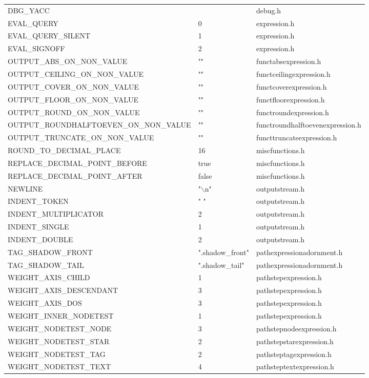 \begin{tiny}
\begin{longtable}[ht]{|p{0.45\tablwidth}|p{0.15\tablwidth}|p{0.3\tablwidth}|}
  \mythickhline DBG\_YACC & & debug.h \\
  \mythickhline EVAL\_QUERY & 0 & expression.h \\
  \hline EVAL\_QUERY\_SILENT & 1 & expression.h \\
  \hline EVAL\_SIGNOFF & 2 & expression.h \\
  \mythickhline OUTPUT\_ABS\_ON\_NON\_VALUE & "" & functabsexpression.h \\
  \hline OUTPUT\_CEILING\_ON\_NON\_VALUE & "" & functceilingexpression.h \\
  \hline OUTPUT\_COVER\_ON\_NON\_VALUE & "" & functcoverexpression.h \\
  \hline OUTPUT\_FLOOR\_ON\_NON\_VALUE & "" & functfloorexpression.h \\
  \hline OUTPUT\_ROUND\_ON\_NON\_VALUE & "" & functroundexpression.h \\
  \hline OUTPUT\_ROUNDHALFTOEVEN\_ON\_NON\_VALUE & "" & functroundhalftoevenexpression.h \\
  \hline OUTPUT\_TRUNCATE\_ON\_NON\_VALUE & "" & functtruncateexpression.h \\
  \mythickhline ROUND\_TO\_DECIMAL\_PLACE & 16 & miscfunctions.h \\
  \hline REPLACE\_DECIMAL\_POINT\_BEFORE & true & miscfunctions.h \\
  \hline REPLACE\_DECIMAL\_POINT\_AFTER & false & miscfunctions.h \\
  \mythickhline NEWLINE & "$\backslash$n" & outputstream.h \\
  \hline INDENT\_TOKEN & " " & outputstream.h \\
  \hline INDENT\_MULTIPLICATOR & 2 & outputstream.h \\
  \hline INDENT\_SINGLE & 1 & outputstream.h \\
  \hline INDENT\_DOUBLE & 2 & outputstream.h \\
  \mythickhline TAG\_SHADOW\_FRONT & ".shadow\_front" & pathexpressionadornment.h \\
  \hline TAG\_SHADOW\_TAIL & ".shadow\_tail" & pathexpressionadornment.h \\
  \mythickhline WEIGHT\_AXIS\_CHILD & 1 & pathstepexpression.h \\
  \hline WEIGHT\_AXIS\_DESCENDANT & 3 & pathstepexpression.h \\
  \hline WEIGHT\_AXIS\_DOS & 3 & pathstepexpression.h \\
  \hline WEIGHT\_INNER\_NODETEST & 1 & pathstepexpression.h \\
  \hline WEIGHT\_NODETEST\_NODE & 3 & pathstepnodeexpression.h \\
  \hline WEIGHT\_NODETEST\_STAR & 2 & pathstepstarexpression.h \\
  \hline WEIGHT\_NODETEST\_TAG & 2 & pathsteptagexpression.h \\
  \hline WEIGHT\_NODETEST\_TEXT & 4 & pathsteptextexpression.h \\


\end{longtable}
\end{tiny}
